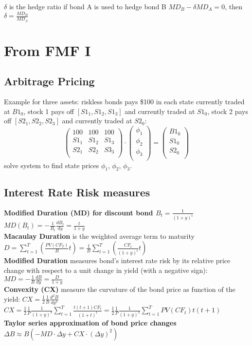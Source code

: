 $\delta$ is the hedge ratio if bond A is used to hedge bond B  $MD_B-\delta MD_A=0$, then  $\delta = \frac{MD_B}{MD_A}$


\section{From FMF I}

\subsection*{Arbitrage Pricing}

Example for three assets: riskless bonds pays \$100 in each state currently traded at $B1_0$, stock 1 pays off $[S1_1, S1_2, S1_3]$ and currently traded at $S1_0$, 
stock 2 pays off $[S2_1, S2_2, S2_3]$ and currently traded at $S2_0$:
$$
\begin{pmatrix}
	100 & 100 & 100   \\
	S1_1 & S1_2 & S1_3 \\
	S2_1 & S2_2 & S3_3 \\							
\end{pmatrix} \cdot 
\begin{pmatrix}
	\phi_1 \\
	\phi_2 \\
	\phi_3 \\								
\end{pmatrix}	
=
\begin{pmatrix}
	B1_0\\
	S1_0 \\
	S2_0 \\								
\end{pmatrix}
$$ 
solve system to find state prices $\phi_1$, $\phi_2$, $\phi_3$.	

\subsection*{Interest Rate Risk measures}
{\bf Modified Duration (MD) for discount bond $ B_t=\frac{1}{(1+y)^t} $ } $ MD(B_t) = -\frac{1}{B_t}\frac{dB_t}{dy} = \frac{t}{1+y}$  \\
{\bf Macaulay Duration} is the weighted average term to maturity  $ D = \sum_{t=1}^{T} \left(   \frac{PV(CF_T)}{B}  t \right)  =   \frac{1}{B}\sum_{t=1}^{T} \left(  \frac{CF_t}{(1+y)^t} t \right)  $ \\
{\bf Modified Duration} measures bond's interest rate risk by its relative price change with respect
to a unit change in yield (with a negative sign):  $ MD =  -\frac{1}{B}\frac{dB}{dy}  = \frac{D}{1+y}  $ \\
{\bf Convexity (CX)} measure the curvature of the bond price as function of the yield:  $ CX =  \frac{1}{2}\frac{1}{B}\frac{d^2B}{dy^2}  $ \\
$ CX = \frac{1}{2} \frac{1}{P} \frac{1}{(1+y)^2} \sum_{t=1}^{T} \frac{t (t+1) CF_t}{(1+t)^t} =  \frac{1}{2} \frac{1}{P} \frac{1}{(1+y)^2} \sum_{t=1}^{T} PV(CF_t) t (t+1)  $ \\
{\bf Taylor series approximation of bond price changes}  $ \Delta B \approx  B \left(  -MD  \cdot \Delta y + CX \cdot ( \Delta y)^2 \right)    $ \\





